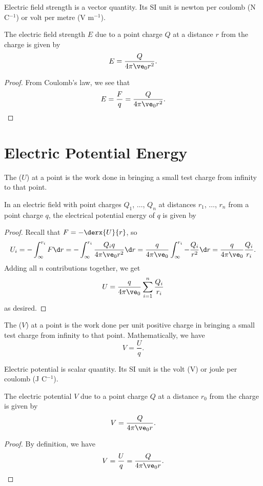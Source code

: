 Electric field strength is a vector quantity. Its SI unit is newton per coulomb (N C$^{-1}$) or volt per metre (V m$^{-1}$).

\begin{proposition}
    The electric field strength $E$ due to a point charge $Q$ at a distance $r$ from the charge is given by \[E = \frac{Q}{4\pi \ve_0 r^2}.\]
\end{proposition}
\begin{proof}
    From Coulomb's law, we see that \[E = \frac{F}{q} = \frac{Q}{4\pi \ve_0 r^2}.\]
\end{proof}

\section{Electric Potential Energy}

\begin{definition}
    The  ($U$) at a point is the work done in bringing a small test charge from infinity to that point.
\end{definition}

\begin{proposition}
    In an electric field with point charges $Q_1$, $\dots$, $Q_n$ at distances $r_1$, $\dots$, $r_n$ from a point charge $q$, the electrical potential energy of $q$ is given by 
\end{proposition}
\begin{proof}
    Recall that $F = -\derx{U}{r}$, so \[U_i = -\int_{\infty}^{r_i} F \d r = -\int_{\infty}^{r_i} \frac{Q_i q}{4\pi \ve_0 r^2} \d r = \frac{q}{4\pi \ve_0} \int_{\infty}^{r_i} -\frac{Q_i}{r^2} \d r = \frac{q}{4\pi \ve_0} \frac{Q_i}{r_i}.\] Adding all $n$ contributions together, we get \[U = \frac{q}{4\pi \ve_0} \sum_{i = 1}^n \frac{Q_i}{r_i}\] as desired.
\end{proof}

\begin{definition}
    The  ($V$) at a point is the work done per unit positive charge in bringing a small test charge from infinity to that point. Mathematically, we have \[V = \frac{U}{q}.\]
\end{definition}

Electric potential is scalar quantity. Its SI unit is the volt (V) or joule per coulomb (J C$^{-1}$).

\begin{proposition}
    The electric potential $V$ due to a point charge $Q$ at a distance $r_0$ from the charge is given by \[V = \frac{Q}{4\pi \ve_0 r}.\]
\end{proposition}
\begin{proof}
    By definition, we have \[V = \frac{U}{q} = \frac{Q}{4\pi \ve_0 r}.\]
\end{proof}

